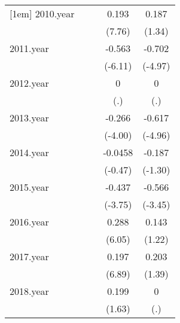 {\begin{tabular}{l*{4}{c}}
[1em]
2010.year   &                     &                     &       0.193\sym{***}&       0.187         \\
            &                     &                     &      (7.76)         &      (1.34)         \\
[1em]
2011.year   &                     &                     &      -0.563\sym{***}&      -0.702\sym{***}\\
            &                     &                     &     (-6.11)         &     (-4.97)         \\
[1em]
2012.year   &                     &                     &           0         &           0         \\
            &                     &                     &         (.)         &         (.)         \\
[1em]
2013.year   &                     &                     &      -0.266\sym{***}&      -0.617\sym{***}\\
            &                     &                     &     (-4.00)         &     (-4.96)         \\
[1em]
2014.year   &                     &                     &     -0.0458         &      -0.187         \\
            &                     &                     &     (-0.47)         &     (-1.30)         \\
[1em]
2015.year   &                     &                     &      -0.437\sym{***}&      -0.566\sym{***}\\
            &                     &                     &     (-3.75)         &     (-3.45)         \\
[1em]
2016.year   &                     &                     &       0.288\sym{***}&       0.143         \\
            &                     &                     &      (6.05)         &      (1.22)         \\
[1em]
2017.year   &                     &                     &       0.197\sym{***}&       0.203         \\
            &                     &                     &      (6.89)         &      (1.39)         \\
[1em]
2018.year   &                     &                     &       0.199         &           0         \\
            &                     &                     &      (1.63)         &         (.)         \\

\end{tabular}}
